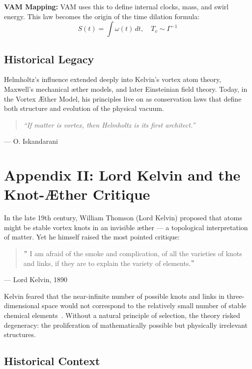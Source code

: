 \documentclass[preprint,notitlepage]{revtex4-2}
\begin{document}
    \textbf{VAM Mapping:} VAM uses this to define internal clocks, mass, and swirl energy. This law becomes the origin of the time dilation formula:
    \[
    S(t) = \int \omega(t) \, dt, \quad T_v \sim \Gamma^{-1}
    \]

    \subsection*{Historical Legacy}

    Helmholtz's influence extended deeply into Kelvin’s vortex atom theory, Maxwell’s mechanical æther models, and later Einsteinian field theory. Today, in the Vortex Æther Model, his principles live on as conservation laws that define both structure and evolution of the physical vacuum.

    \begin{quote}
    \textit{“If matter is vortex, then Helmholtz is its first architect.”}
    \end{quote}
   \hfill — O. Iskandarani

\section*{Appendix II: Lord Kelvin and the Knot-Æther Critique}
\label{appendix:kelvin}

    In the late 19th century, William Thomson (Lord Kelvin) proposed that atoms might be stable vortex knots in an invisible æther — a topological interpretation of matter. Yet he himself raised the most pointed critique:

    \begin{quote}
    \("\) I am afraid of the smoke and complication, of all the varieties of knots and links, if they are to explain the variety of elements.\("\)
    \end{quote}
 \hfill  — Lord Kelvin, 1890

    Kelvin feared that the near-infinite number of possible knots and links in three-dimensional space would not correspond to the relatively small number of stable chemical elements~\cite{thomson1890knots, tait1877knots}. Without a natural principle of selection, the theory risked degeneracy: the proliferation of mathematically possible but physically irrelevant structures.

    \subsection*{Historical Context}
\end{document}
